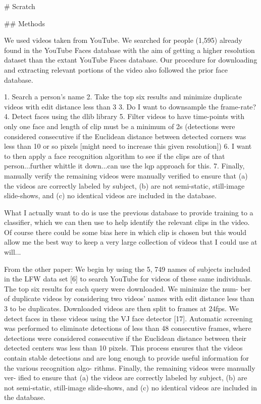 # Scratch

## Methods

We used videos taken from YouTube. We searched for people (1,595) already found in the YouTube Faces database with the aim of getting a higher resolution dataset than the extant YouTube Faces database. Our procedure for downloading and extracting relevant portions of the video also followed the prior face database. 

1. Search a person's name
2. Take the top six results and minimize duplicate videos with edit distance less than 3
3. Do I want to downsample the frame-rate?
4. Detect faces using the dlib library
5. Filter videos to have time-points with only one face and length of clip must be a minimum of 2s (detections were considered consecutive if the Euclidean distance between detected corners was less than 10 or so pixels [might need to increase this given resolution])
6. I want to then apply a face recognition algorithm to see if the clips are of that person...further whittle it down...can use the lqp approach for this.
7. Finally, manually verify the remaining videos were manually verified to ensure that (a) the videos are correctly labeled by subject, (b) are not semi-static, still-image slide-shows, and (c) no identical videos are included in the database.

What I actually want to do is use the previous database to provide training to a classifier, which we can then use to help identify the relevant clips in the video. Of course there could be some bias here in which clip is chosen but this would allow me the best way to keep a very large collection of videos that I could use at will...

From the other paper:
We begin by using the 5, 749 names of subjects included in the LFW data set [6] to search YouTube for videos of these same individuals. The top six results for each query were downloaded. We minimize the num- ber of duplicate videos by considering two videos’ names with edit distance less than 3 to be duplicates. Downloaded videos are then split to frames at 24fps. We detect faces in these videos using the VJ face detector [17]. Automatic screening was performed to eliminate detections of less than 48 consecutive frames, where detections were considered consecutive if the Euclidean distance between their detected centers was less than 10 pixels. This process ensures that the videos contain stable detections and are long enough to provide useful information for the various recognition algo- rithms. Finally, the remaining videos were manually ver- ified to ensure that (a) the videos are correctly labeled by subject, (b) are not semi-static, still-image slide-shows, and (c) no identical videos are included in the database.
